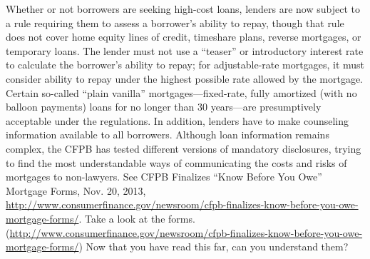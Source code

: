 \item Whether or not borrowers are seeking high-cost loans, lenders are now
subject to a rule requiring them to assess a borrower's ability to repay,
though that rule does not cover home equity lines of credit, timeshare plans,
reverse mortgages, or temporary loans.  The lender must not use a ``teaser'' or
introductory interest rate to calculate the borrower's ability to repay; for
adjustable-rate mortgages, it must consider ability to repay under the highest
possible rate allowed by the mortgage.  Certain so-called ``plain vanilla''
mortgages---fixed-rate, fully amortized (with no balloon payments) loans for
no longer than 30 years---are presumptively acceptable under the regulations. 
In addition, lenders have to make counseling information available to all
borrowers.  Although loan information remains complex, the CFPB has tested
different versions of mandatory disclosures, trying to find the
most
understandable ways of communicating the costs and risks of mortgages to
non-lawyers.  See CFPB Finalizes ``Know Before You Owe'' Mortgage Forms, Nov.
20, 2013,
\url{http://www.consumerfinance.gov/newsroom/cfpb-finalizes-know-before-you-owe-mortgage-forms/}.
Take a look at the forms.
(\url{http://www.consumerfinance.gov/newsroom/cfpb-finalizes-know-before-you-owe-mortgage-forms/})
Now that you have read this far, can you understand them?

